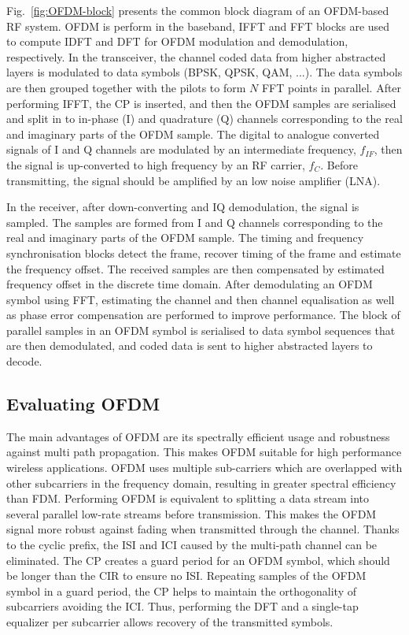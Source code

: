 Fig.~\ref{fig:OFDM-block} presents the common block diagram of an OFDM-based RF system.
OFDM is perform in the baseband, IFFT and FFT blocks are used to compute IDFT and DFT for OFDM modulation and demodulation, respectively.
In the transceiver, the channel coded data from higher abstracted layers is modulated to data symbols (BPSK, QPSK, QAM, ...). The data symbols are then grouped together with the pilots to form $N$ FFT points in parallel.
After performing IFFT, the CP is inserted, and then the OFDM samples are serialised and split in to in-phase (I) and quadrature (Q) channels corresponding to the real and imaginary parts of  the OFDM sample. 
The digital to analogue converted signals of I and Q channels are modulated by an intermediate frequency, $f_{IF}$, then the signal is up-converted to high frequency by an RF carrier, $f_{C}$. 
Before transmitting, the signal should be amplified by an low noise amplifier (LNA).

In the receiver, after down-converting and IQ demodulation, the signal is sampled. The samples are formed from I and Q channels corresponding to the real and imaginary parts of the OFDM sample.
The timing and frequency synchronisation blocks detect the frame, recover timing of the frame and estimate the frequency offset. 
The received samples are then compensated by estimated frequency offset in the discrete time domain. 
After demodulating an OFDM symbol using FFT, estimating the channel and then channel equalisation as well as phase error compensation are performed to improve performance.
The block of parallel samples in an OFDM symbol is serialised to data symbol sequences that are then demodulated, and coded data is sent to higher abstracted layers to decode.

\subsection{Evaluating OFDM}

The main advantages of OFDM are its spectrally efficient usage and robustness against multi path propagation.
This makes OFDM suitable for high performance wireless applications. 
OFDM uses multiple sub-carriers which are overlapped with other subcarriers in the frequency domain, resulting in greater spectral efficiency than FDM. 
Performing OFDM is equivalent to splitting a data stream into several parallel low-rate streams before transmission.
This makes the OFDM signal more robust against fading when transmitted through the channel. 
Thanks to the cyclic prefix, the ISI and ICI caused by the multi-path channel can be eliminated. 
The CP creates a guard period for an OFDM symbol, which should be longer than the CIR to ensure no ISI.
Repeating samples of the OFDM symbol in a guard period, the CP helps to maintain the orthogonality of subcarriers avoiding the ICI. 
Thus, performing the DFT and a single-tap equalizer per subcarrier allows recovery of the transmitted symbols.

